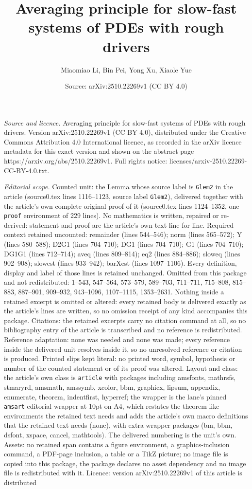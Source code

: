 \documentclass[10pt,a4paper]{amsart}
\title[Averaging principle for slow-fast systems of PDEs with rough]{Averaging principle for slow-fast systems of PDEs with rough drivers}
\author{Miaomiao Li, Bin Pei, Yong Xu, Xiaole Yue}
\date{Source: arXiv:2510.22269v1 (CC BY 4.0)}
\begin{document}
\maketitle

\noindent\emph{Source and licence.} Averaging principle for slow-fast systems of PDEs with rough drivers. Version arXiv:2510.22269v1 (CC BY 4.0), distributed under the Creative Commons Attribution 4.0 International licence, as recorded in the arXiv licence metadata for this exact version and shown on the abstract page https://arxiv.org/abs/2510.22269v1. Full rights notice: licenses/arxiv-2510.22269-CC-BY-4.0.txt.\par\smallskip

\noindent\textit{Editorial scope.} Counted unit: the Lemma whose source label is \texttt{Glem2} in the article (source0.tex lines 1116--1123, source label \texttt{Glem2}), delivered together with the article's own complete original proof of it (source0.tex lines 1124--1352, one \texttt{proof} environment of 229 lines). No mathematics is written, repaired or re-derived: statement and proof are the article's own text line for line. Required context retained uncounted: remainder (lines 544--546); norm (lines 565--572); Y (lines 580--588); D2G1 (lines 704--710); DG1 (lines 704--710); G1 (lines 704--710); DG1G1 (lines 712--714); aveq (lines 809--814); eq2 (lines 884--886); sloweq (lines 902--908); slowest (lines 933--942); barXest (lines 1097--1106). Every definition, display and label of those lines is retained unchanged. Omitted from this package and not redistributed: 1--543, 547--564, 573--579, 589--703, 711--711, 715--808, 815--883, 887--901, 909--932, 943--1096, 1107--1115, 1353--2631. Nothing inside a retained excerpt is omitted or altered: every retained body is delivered exactly as the article's lines are written, so no omission receipt of any kind accompanies this package. Citations: the retained excerpts carry no citation command at all, so no bibliography entry of the article is transcribed and no reference is redistributed. Reference adaptation: none was needed and none was made; every reference inside the delivered unit resolves inside it, so no unresolved reference or citation is produced. Printed slips kept literal: no printed word, symbol, hypothesis or number of the counted statement or of its proof was altered. Layout and class: the article's own class is \texttt{article} with packages including amsfonts, mathrsfs, stmaryrd, amsmath, amssymb, xcolor, bbm, graphicx, lipsum, appendix, enumerate, theorem, indentfirst, hyperref; the wrapper is the lane's pinned \texttt{amsart} editorial wrapper at 10pt on A4, which restates the theorem-like environments the retained text needs and adds the article's own macro definitions that the retained text needs (none), with extra wrapper packages (bm, bbm, dsfont, xspace, cancel, mathtools). The delivered numbering is the unit's own. Assets: no retained span contains a figure environment, a graphics-inclusion command, a PDF-page inclusion, a table or a TikZ picture; no image file is copied into this package, the package declares no asset dependency and no image file is redistributed with it. Licence: version arXiv:2510.22269v1 of this article is distributed 
\end{document}
